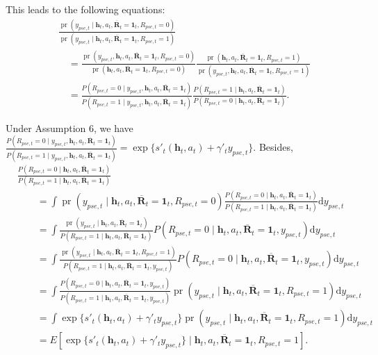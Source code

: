 \documentclass[12pt]{article}
\DeclareMathOperator{\pr}{pr}
\begin{document}
This leads to the following equations:
\begin{align*}
    &\frac{\pr(y_{pse,t}\mid \bm{h}_t,a_t,\overline{\bm{R}}_t = \bm{1}_t,R_{pse,t}=0)}{\pr(y_{pse,t}\mid \bm{h}_t,a_t,\overline{\bm{R}}_t = \bm{1}_t,R_{pse,t}=1)} \\
    &\quad = \frac{\pr(y_{pse,t},\bm{h}_t,a_t,\overline{\bm{R}}_t = \bm{1}_t,R_{pse,t}=0)}{\pr (\bm{h}_t,a_t,\overline{\bm{R}}_t = \bm{1}_t,R_{pse,t}=0)}\frac{\pr (\bm{h}_t,a_t,\overline{\bm{R}}_t = \bm{1}_t,R_{pse,t}=1)}{\pr(y_{pse,t},\bm{h}_t,a_t,\overline{\bm{R}}_t = \bm{1}_t,R_{pse,t}=1)}\\
    &\quad = \frac{P(R_{pse,t}=0\mid y_{pse,t},\bm{h}_t,a_t,\overline{\bm{R}}_t = \bm{1}_t)}{P(R_{pse,t}=1\mid y_{pse,t},\bm{h}_t,a_t,\overline{\bm{R}}_t = \bm{1}_t)}\frac{P(R_{pse,t}=1\mid \bm{h}_t,a_t,\overline{\bm{R}}_t = \bm{1}_t)}{P(R_{pse,t}=0 \mid \bm{h}_t,a_t,\overline{\bm{R}}_t = \bm{1}_t)}.
\end{align*}

Under Assumption 6, we have $\frac{P(R_{pse,t}=0\mid y_{pse,t},\bm{h}_t,a_t,\overline{\bm{R}}_t = \bm{1}_t)}{P(R_{pse,t}=1\mid y_{pse,t},\bm{h}_t,a_t,\overline{\bm{R}}_t = \bm{1}_t)} = \exp\{s'_t(\bm{h}_t,a_t)+\gamma'_t y_{pse,t}\}$. Besides, 
\begin{align*}
    &\frac{P(R_{pse,t}=0 \mid \bm{h}_t,a_t,\overline{\bm{R}}_t = \bm{1}_t)}{P(R_{pse,t}=1\mid \bm{h}_t,a_t,\overline{\bm{R}}_t = \bm{1}_t)} \\
    & \qquad = \int \pr(y_{pse,t} \mid \bm{h}_t,a_t,\overline{\bm{R}}_t = \bm{1}_t,R_{pse,t}=0) \frac{P(R_{pse,t}=0 \mid \bm{h}_t,a_t,\overline{\bm{R}}_t = \bm{1}_t)}{P(R_{pse,t}=1\mid \bm{h}_t,a_t,\overline{\bm{R}}_t = \bm{1}_t)} \mathrm{d} y_{pse,t}\\
    & \qquad =\int \frac{\pr\left(y_{pse,t} \mid \bm{h}_t,a_t,\overline{\bm{R}}_t = \bm{1}_t\right)}{P\left(R_{pse,t}=1 \mid \bm{h}_t,a_t,\overline{\bm{R}}_t = \bm{1}_t\right)} P\left(R_{pse,t}=0 \mid \bm{h}_t,a_t,\overline{\bm{R}}_t = \bm{1}_t, y_{pse,t}\right) \mathrm{d} y_{pse,t}\\
    & \qquad =\int \frac{\pr\left(y_{pse,t} \mid \bm{h}_t,a_t,\overline{\bm{R}}_t = \bm{1}_t, R_{pse,t}=1\right)}{P\left(R_{pse,t}=1 \mid \bm{h}_t,a_t,\overline{\bm{R}}_t = \bm{1}_t, y_{pse,t}\right)} P\left(R_{pse,t}=0 \mid \bm{h}_t,a_t,\overline{\bm{R}}_t = \bm{1}_t, y_{pse,t}\right) \mathrm{d} y_{pse,t}\\
    & \qquad =\int \frac{P\left(R_{pse,t}=0 \mid \bm{h}_t,a_t,\overline{\bm{R}}_t = \bm{1}_t, y_{pse,t}\right)}{P\left(R_{pse,t}=1 \mid \bm{h}_t,a_t,\overline{\bm{R}}_t = \bm{1}_t, y_{pse,t}\right)} \pr\left(y_{pse,t} \mid \bm{h}_t,a_t,\overline{\bm{R}}_t = \bm{1}_t, R_{pse,t}=1\right) \mathrm{d} y_{pse,t} \\
    & \qquad = \int \exp\{s'_t(\bm{h}_t,a_t)+\gamma'_t y_{pse,t}\} \pr\left(y_{pse,t} \mid \bm{h}_t,a_t,\overline{\bm{R}}_t = \bm{1}_t, R_{pse,t}=1\right) \mathrm{d} y_{pse,t}\\
    & \qquad = E[\exp\{s'_t(\bm{h}_t,a_t)+\gamma'_t y_{pse,t}\} \mid \bm{h}_t,a_t,\overline{\bm{R}}_t = \bm{1}_t, R_{pse,t}=1].
\end{align*}
\end{document}
